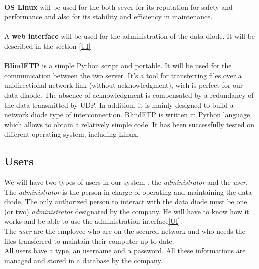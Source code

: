 \documentclass[a4paper,10pt]{article}
\begin{document}
\paragraph{} \textbf{OS Linux} will be used for the both sever for its reputation for safety and performance and also for its stability and efficiency in maintenance.

\paragraph{} A \textbf{web interface} will be used for the administration of the data diode. It will be described in the section \ref{UI}

\paragraph{} \textbf{BlindFTP} is a simple Python script and portable. It will be used for the communication between the two server. It's a tool for transferring files over a unidirectional network link (without acknowledgment), wich is perfect for our data diaode. The absence of acknowledgment is compensated by a redundancy of the data transmitted by UDP. In addition, it is mainly designed to build a network diode type of interconnection. BlindFTP is written in Python language, which allows to obtain a relatively simple code. It has been successfully tested on different operating system, including Linux.

\subsection{Users} 
We will have two types of users in our system : the \textit{administrator} and the \textit{user}.\\

The \textit{administrator} is the person in charge of operating and maintaining the data diode. The only authorized person to interact with the data diode must be one (or two) \textit{administrator} designated by the company. He will have to know how it works and be able to use the administration interface\ref{UI}.\\

The \textit{user} are the employee who are on the secured network and who needs the files
transferred to maintain their computer up-to-date.\\

All users have a type, an username and a password. All these informations are
managed and stored in a database by the company.
\end{document}
